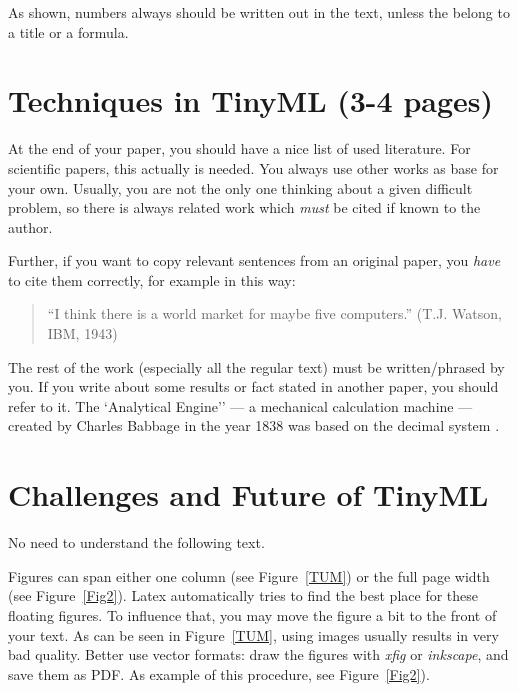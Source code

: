 \documentclass[A4,twocolumn]{article}
\begin{document}
As shown, numbers always should be written out in the text, unless the
belong to a title or a formula.

\section{Techniques in TinyML (3-4 pages)}

At the end of your paper, you should have a nice list of used
literature. For scientific papers, this actually is needed. You always
use other works as base for your own. Usually, you are not the only
one thinking about a given difficult problem, so there is always
related work which {\em must} be cited if known to the author.

Further, if you want to copy relevant sentences from an
original paper, you {\em have} to cite them correctly, for example
in this way:

\begin{quote}
	``I think there is a world market for maybe five computers.''
	(T.J. Watson, IBM, 1943)
\end{quote}

The rest of the work (especially all the regular text) must be
written/phrased by you. If you write about some results or fact
stated in another paper, you should refer to it.
The `Analytical Engine'' --- a mechanical calculation machine ---
created by Charles Babbage in the year 1838 was based on the decimal
system
\cite{hussein_original_2024, paul_rethinking_2021, de_prado_robustifying_2020,ren_synergy_2021,roshan_adaptive_2021}.

\section{Challenges and Future of TinyML }

No need to understand the following text.

Figures can span either one column (see Figure~\ref{TUM}) or the full
page width (see Figure~\ref{Fig2}).
Latex automatically tries to find the best place for these floating
figures. To influence that, you may move the figure a bit to the front
of your text.
As can be seen in Figure~\ref{TUM}, using images usually results in very
bad quality. Better use vector formats: draw the figures with
{\em xfig} or {\em inkscape}, and save them as PDF. As example of
this procedure, see Figure~\ref{Fig2}).
\end{document}
